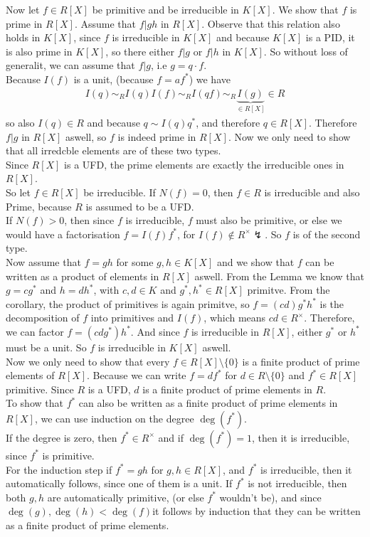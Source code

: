 Now let $f \in R[X]$ be primitive and be irreducible in $K[X]$. We show that $f$ is prime in $R[X]$. Assume that $f|gh$ in $R[X]$. Observe that this relation also holds in $K[X]$, since $f$ is irreducible in $K[X]$ and because $K[X]$ is a PID, it is also prime in $K[X]$, so there either $f|g$ or $f|h$ in $K[X]$. So without loss of generalit, we can assume that $f|g$, i.e $g = q \cdot f$.\\
Because $I(f)$ is a unit, (because $f = a f^*$) we have
\begin{align*}
I(q) \sim_R I(q) I(f) \sim_R I(qf) \sim_R \underbrace{I(g)}_{\in R[X]} \in R
\end{align*}
so also $I(q) \in R$ and because $q \sim I(q)q^*$, and therefore $q \in R[X]$. Therefore $f|g$ in $R[X]$ aswell, so $f$ is indeed prime in $R[X]$.
Now we only need to show that all irredcble elements are of these two types.\\
Since $R[X]$ is a UFD, the prime elements are exactly the irreducible ones in $R[X]$.\\
So let $f \in R[X]$ be irreducible. If $N(f) = 0$, then $f \in R$ is irreducible and also Prime, because $R$ is assumed to be a UFD. \\
If $N(f) > 0$, then since $f$ is irreducible, $f$ must also be primitive, or else we would have a factorisation $f = I(f) f^*$, for $I(f) \not\in R^{\times} \lightning$. So $f$ is of the second type.\\
Now assume that $f = gh$ for some $g,h \in K[X]$ and we show that $f$ can be written as a product of elements in $R[X]$ aswell. From the Lemma we know that $g = cg^*$ and $h = dh^*$, with $c,d \in K$ and $g^*,h^* \in R[X]$ primitve. From the corollary, the product of primitives is again primitve, so $f = (cd)g^*h^*$ is the decomposition of $f$ into primitives and $I(f)$, which means $cd \in R^\times$. Therefore, we can factor $f = (cdg^*) h^*$. And since $f$ is irreducible in $R[X]$, either $g^*$ or $h^*$ must be a unit. So $f$ is irreducible in $K[X]$ aswell.\\

Now we only need to show that every $f \in R[X] \setminus \{0\}$ is a finite product of prime elements of $R[X]$. Because we can write $f = d f^*$ for $d \in R \setminus \{0\}$ and $f^* \in R[X]$ primitive. Since $R$ is a UFD, $d$ is a finite product of prime elements in $R$.\\
To show that $f^*$ can also be written as a finite product of prime elements in $R[X]$, we can use induction on the degree $\deg(f^*)$.\\
If the degree is zero, then $f^* \in R^\times$ and if $\deg(f^*) = 1$, then it is irreducible, since $f^*$ is primitive.\\
For the induction step if $f^* = gh$ for $g,h \in R[X]$, and $f^*$ is irreducible, then it automatically follows, since one of them is a unit. If $f^*$ is not irreducible, then both $g,h$ are automatically primitive, (or else $f^*$ wouldn't be), and since $\deg(g), \deg(h) < \deg(f)$it follows by induction that they can be written as a finite product of prime elements.



